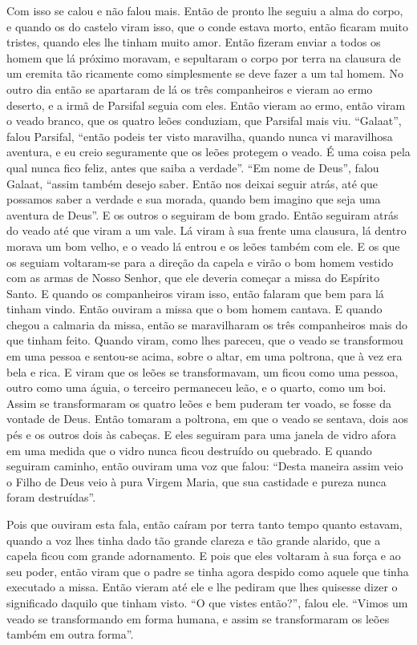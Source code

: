 Com isso se calou e não falou mais. Então de pronto lhe seguiu a alma do corpo,
e quando os do castelo viram isso, que o conde estava morto, então ficaram
muito tristes, quando eles lhe tinham muito amor. Então fizeram enviar a todos
os homem que lá próximo moravam, e sepultaram o corpo por terra na clausura de
um eremita tão ricamente como simplesmente se deve fazer a um tal homem. No
outro dia então se apartaram de lá os três companheiros e vieram ao ermo
deserto, e a irmã de Parsifal seguia com eles. Então vieram ao ermo, então
viram o veado branco, que os quatro leões conduziam, que Parsifal mais viu.
“Galaat”, falou Parsifal, “então podeis ter visto maravilha, quando nunca vi
maravilhosa aventura, e eu creio seguramente que os leões protegem o veado. É
uma coisa pela qual nunca fico feliz, antes que saiba a verdade”. “Em nome de
Deus”, falou Galaat, “assim também desejo saber. Então nos deixai seguir atrás,
até que possamos saber a verdade e sua morada, quando bem imagino que seja uma
aventura de Deus”. E os outros o seguiram de bom grado. Então seguiram atrás do
veado até que viram a um vale. Lá viram à sua frente uma clausura, lá dentro
morava um bom velho, e o veado lá entrou e os leões também com ele. E os que os
seguiam voltaram-se para a direção da capela e virão o bom homem vestido com as
armas de Nosso Senhor, que ele deveria começar a missa do Espírito Santo. E
quando os companheiros viram isso, então falaram que bem para lá tinham vindo.
Então ouviram a missa que o bom homem cantava. E quando chegou a calmaria da
missa, então se maravilharam os três companheiros mais do que tinham feito.
Quando viram, como lhes pareceu, que o veado se transformou em uma pessoa e
sentou-se acima, sobre o altar, em uma poltrona, que à vez era bela e rica. E
viram que os leões se transformavam, um ficou como uma pessoa, outro como uma
águia, o terceiro permaneceu leão, e o quarto, como um boi. Assim se
transformaram os quatro leões e bem puderam ter voado, se fosse da vontade de
Deus. Então tomaram a poltrona, em que o veado se sentava, dois aos pés e os
outros dois às cabeças. E eles seguiram para uma janela de vidro afora em uma
medida que o vidro nunca ficou destruído ou quebrado. E quando seguiram
caminho, então ouviram uma voz que falou: “Desta maneira assim veio o Filho de
Deus veio à pura Virgem Maria, que sua castidade e pureza nunca foram
destruídas”.

Pois que ouviram esta fala, então caíram por terra tanto tempo quanto estavam,
quando a voz lhes tinha dado tão grande clareza e tão grande alarido, que a
capela ficou com grande adornamento. E pois que eles voltaram à sua força e ao
seu poder, então viram que o padre se tinha agora despido como aquele que tinha
executado a missa. Então vieram até ele e lhe pediram que lhes quisesse dizer o
significado daquilo que tinham visto. “O que vistes então?”, falou ele. “Vimos
um veado se transformando em forma humana, e assim se transformaram os leões
também em outra forma”. 

